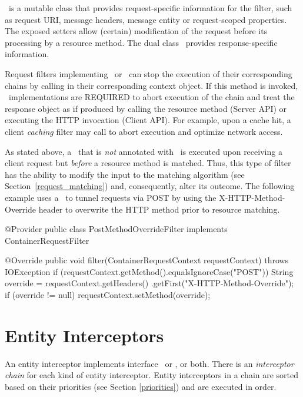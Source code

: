 \ContainerRequestContext\ is a mutable class that provides request-specific information for the filter, such as request URI, message headers, message entity or request-scoped properties. The exposed setters allow (certain) modification of the request before its processing by a resource method. The dual class \ContainerResponseContext\ provides response-specific information.

Request filters implementing \ClientRequestFilter\ or \ContainerRequestFilter\ can stop the execution of their corresponding chains by calling  in their corresponding context object. If this method is invoked, \jaxrs\ implementations are REQUIRED to abort execution of the chain and treat the response object as if produced by calling the resource method (Server API) or executing the HTTP invocation (Client API). For example, upon a cache hit, a client {\em caching} filter may call  to abort execution and optimize network access.

As stated above, a \ContainerRequestFilter\ that is \emph{not} annotated with \PostMatching\ is executed upon receiving a client request but {\em before} a resource method is matched. Thus, this type of filter has the ability to modify the input to the matching algorithm (see Section~\ref{request_matching}) and, consequently, alter its outcome. 
The following example uses a \ContainerRequestFilter\ to tunnel requests via POST by using the X-HTTP-Method-Override header to overwrite the HTTP method prior to resource matching.

\begin{listing}{1}
@Provider
public class PostMethodOverrideFilter implements ContainerRequestFilter {

    @Override
    public void filter(ContainerRequestContext requestContext) 
        throws IOException {
        if (requestContext.getMethod().equalsIgnoreCase("POST")) {
            String override = requestContext.getHeaders()
                .getFirst("X-HTTP-Method-Override");
            if (override != null) {
                requestContext.setMethod(override);
            }
        }
    }
}
\end{listing}

\section{Entity Interceptors}

An entity interceptor implements interface \ReaderInterceptor\ or \WriterInterceptor, or both. There is an \emph{interceptor chain} for each kind of entity interceptor. Entity interceptors in a chain are sorted based on their priorities (see Section \ref{priorities}) and are executed in order. 

